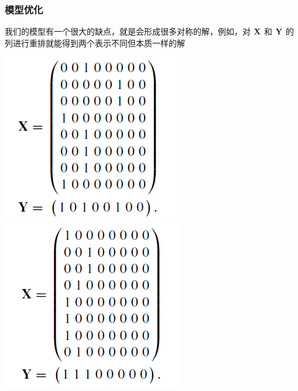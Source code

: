 \documentclass[UTF8]{beamer}
\begin{document}
\begin{frame}
  \frametitle{模型优化}
  
  我们的模型有一个很大的缺点，就是会形成很多对称的解，例如，对 $\bold{X}$ 和 $\bold{Y}$ 的列进行重排就能得到两个表示不同但本质一样的解
  \begin{center}
    \includegraphics[scale=0.5]{figs/sol1.png}
  \includegraphics[scale=0.5]{figs/sol2.png}
  \end{center}
  
\end{frame}
\end{document}
